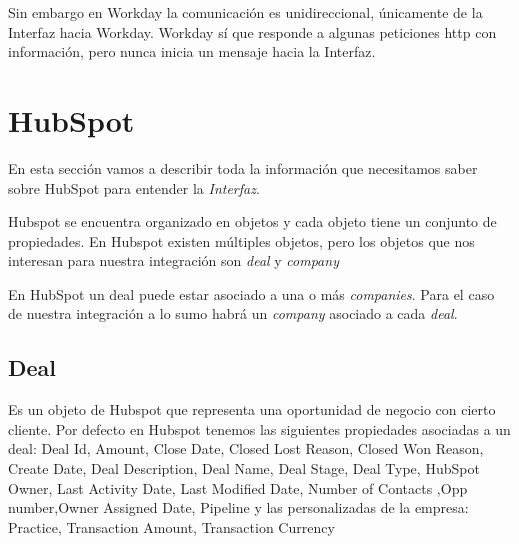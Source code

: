 Sin embargo en Workday la comunicación es unidireccional, únicamente de la Interfaz hacia Workday. Workday sí que responde a algunas peticiones \acrshort{http} con información, pero nunca inicia un mensaje hacia la Interfaz.

\section{HubSpot}
En esta sección vamos a describir toda la información que necesitamos saber sobre HubSpot para entender la \textit{Interfaz}.

Hubspot se encuentra organizado en objetos y cada objeto tiene un conjunto de propiedades.
En Hubspot existen múltiples objetos, pero los objetos que nos interesan para nuestra integración son \textit{deal} y \textit{company}


En HubSpot un deal puede estar asociado a una o más \textit{companies}. Para el caso de nuestra integración a lo sumo habrá un \textit{company} asociado a cada \textit{deal}.

\subsection{Deal}
	Es un objeto de Hubspot que representa una oportunidad de negocio con cierto cliente. Por defecto en Hubspot tenemos las siguientes propiedades asociadas a un deal:			
		Deal Id, Amount, Close Date, Closed Lost Reason, Closed Won Reason, Create Date, Deal Description, Deal Name, Deal Stage, Deal Type, HubSpot Owner, Last Activity Date, Last Modified Date, Number of Contacts
		,Opp number,Owner Assigned Date, Pipeline y las personalizadas de la empresa: Practice, Transaction Amount, Transaction Currency
		
